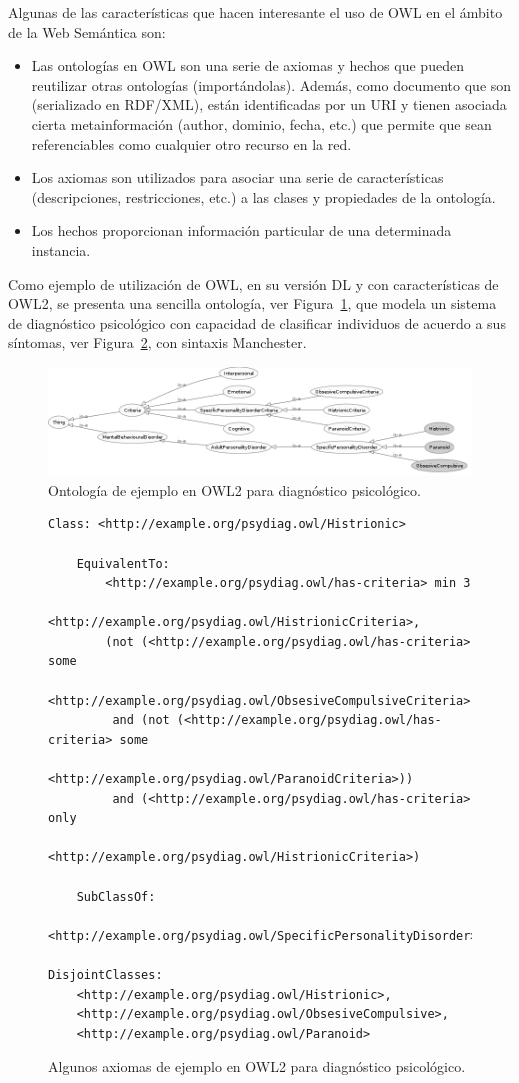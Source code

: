 Algunas de las características que hacen interesante el uso de OWL en el ámbito
de la Web Semántica son:
\begin{itemize}
  \item Las ontologías en OWL son una serie de axiomas y hechos que pueden
  reutilizar otras ontologías (importándolas). Además, como documento que son
  (serializado en RDF/XML), están identificadas por un URI y tienen asociada cierta metainformación
  (author, dominio, fecha, etc.) que permite que sean referenciables como
  cualquier otro recurso en la red.
  \item Los axiomas son utilizados para asociar una serie de características
  (descripciones, restricciones, etc.) a las clases y propiedades de la
  ontología. 
\item Los hechos proporcionan información particular de una determinada instancia. 
\end{itemize}

Como ejemplo de utilización de OWL, en su versión DL y con características de OWL2, se presenta una sencilla
ontología, ver Figura~\ref{fig:psydiag}, que modela un sistema de diagnóstico psicológico con capacidad de clasificar individuos
de acuerdo a sus síntomas, ver Figura~\ref{fig:psydiag-axiomas}, con sintaxis Manchester.

\begin{figure}[htb]
\centering
	\includegraphics[width=16cm]{images/psydiag}
\caption{Ontología de ejemplo en OWL2 para diagnóstico psicológico.}
\label{fig:psydiag}
\end{figure}


\begin{figure}[htb]
\centering
 \begin{lstlisting} 
Class: <http://example.org/psydiag.owl/Histrionic>

    EquivalentTo: 
        <http://example.org/psydiag.owl/has-criteria> min 3
	      <http://example.org/psydiag.owl/HistrionicCriteria>,
        (not (<http://example.org/psydiag.owl/has-criteria> some 
	      <http://example.org/psydiag.owl/ObsesiveCompulsiveCriteria>))
         and (not (<http://example.org/psydiag.owl/has-criteria> some 
	      <http://example.org/psydiag.owl/ParanoidCriteria>))
         and (<http://example.org/psydiag.owl/has-criteria> only 
	      <http://example.org/psydiag.owl/HistrionicCriteria>)
    
    SubClassOf: 
        <http://example.org/psydiag.owl/SpecificPersonalityDisorder>

DisjointClasses: 
    <http://example.org/psydiag.owl/Histrionic>,
    <http://example.org/psydiag.owl/ObsesiveCompulsive>,
    <http://example.org/psydiag.owl/Paranoid>
  \end{lstlisting} 
\caption{Algunos axiomas de ejemplo en OWL2 para diagnóstico psicológico.}
\label{fig:psydiag-axiomas}
\end{figure}


